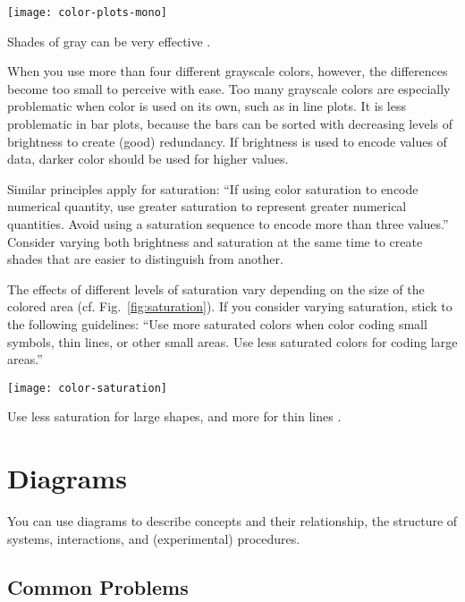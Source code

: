 \begin{marginfigure}
\centering
\texttt{[image: color-plots-mono]}
\caption{\label{fig:monographs} Shades of gray can be very effective \cite{Carter12}.}%
\end{marginfigure}

When you use more than four different grayscale colors, however, the differences become too small to perceive with ease. Too many grayscale colors are especially problematic when color is used on its own, such as in line plots. It is less problematic in bar plots, because the bars can be sorted with decreasing levels of brightness to create (good) redundancy. If brightness is used to encode values of data, darker color should be used for higher values.

Similar principles apply for saturation: ``If using color saturation to encode numerical quantity, use greater saturation to represent greater numerical quantities. Avoid using a saturation sequence to encode more than three values.'' \cite{Ware12} Consider varying both brightness and saturation at the same time to create shades that are easier to distinguish from another.

The effects of different levels of saturation vary depending on the size of the colored area (cf. Fig.~\ref{fig:saturation}). If you consider varying saturation, stick to the following guidelines: ``Use more saturated colors when color coding small symbols, thin lines, or other small areas. Use less saturated colors for coding large areas.'' \cite{Ware12}

\begin{marginfigure}
\centering
\texttt{[image: color-saturation]}
\caption{\label{fig:saturation} Use less saturation for large shapes, and more for thin lines \cite{Ware12}.}%
\end{marginfigure}



\section{Diagrams}

You can use diagrams to describe concepts and their relationship, the structure of systems, interactions, and (experimental) procedures.

\subsection{Common Problems}

